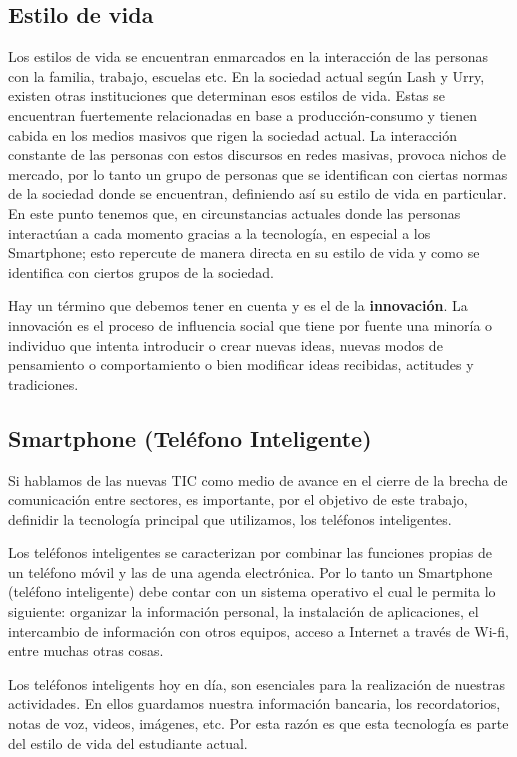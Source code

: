	\subsection{Estilo de vida}
	Los estilos de vida se encuentran enmarcados en la interacción de las personas con la familia, trabajo, escuelas etc. En la sociedad actual según Lash y Urry, existen otras instituciones que determinan esos estilos de vida. \cite{03} Estas se encuentran fuertemente relacionadas en base a producción-consumo y tienen cabida en los medios masivos que rigen la sociedad actual. La interacción constante de las personas con estos discursos en redes masivas, provoca nichos de mercado, por lo tanto un grupo de personas que se identifican con ciertas normas de la sociedad donde se encuentran, definiendo así su estilo de vida en particular. En este punto tenemos que, en circunstancias actuales donde las personas interactúan a cada momento gracias a la tecnología, en especial a los Smartphone; esto repercute de manera directa en su estilo de vida y como se identifica con ciertos grupos de la sociedad. 
	
	Hay un término que debemos tener en cuenta y es el de la \textbf{innovación}. La innovación  es el proceso de influencia social que tiene por fuente una minoría o individuo que intenta introducir o crear nuevas ideas, nuevas modos de pensamiento o comportamiento o bien modificar ideas recibidas, actitudes y tradiciones. \cite{04}
	 
	\subsection{Smartphone (Teléfono Inteligente)}
	Si hablamos de las nuevas TIC como medio de avance en el cierre de la brecha de comunicación entre sectores, es importante,  por el objetivo de este trabajo, definidir la tecnología principal que utilizamos, los teléfonos inteligentes.
	
	Los teléfonos inteligentes se caracterizan por combinar las funciones propias de un teléfono móvil y las de una agenda electrónica. Por lo tanto un Smartphone (teléfono inteligente) debe contar con un sistema operativo el cual le permita lo siguiente:
	organizar la información personal, la instalación de aplicaciones, el intercambio de información con otros equipos, acceso a Internet a través de Wi-fi, entre muchas otras cosas. \cite{05}
	
	Los teléfonos inteligents hoy en día, son esenciales para la realización de nuestras actividades. En ellos guardamos nuestra información bancaria, los recordatorios, notas de voz, videos, imágenes, etc. Por esta razón es que esta tecnología es parte del estilo de vida del estudiante actual.

